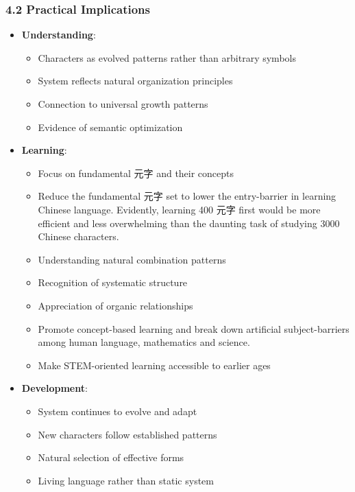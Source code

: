 \documentclass[
  11pt,
  letterpaper,
]{article}
\providecommand{\tightlist}{%
  \setlength{\itemsep}{0pt}\setlength{\parskip}{0pt}}
\begin{document}
\hypertarget{practical-implications}{%
\subsubsection{4.2 Practical
Implications}\label{practical-implications}}

\begin{itemize}
\tightlist
\item
  \textbf{Understanding}:

  \begin{itemize}
  \tightlist
  \item
    Characters as evolved patterns rather than arbitrary symbols
  \item
    System reflects natural organization principles
  \item
    Connection to universal growth patterns
  \item
    Evidence of semantic optimization
  \end{itemize}
\item
  \textbf{Learning}:

  \begin{itemize}
  \tightlist
  \item
    Focus on fundamental 元字 and their concepts
  \item
    Reduce the fundamental 元字 set to lower the entry-barrier in
    learning Chinese language. Evidently, learning 400 元字 first would
    be more efficient and less overwhelming than the daunting task of
    studying 3000 Chinese characters.
  \item
    Understanding natural combination patterns
  \item
    Recognition of systematic structure
  \item
    Appreciation of organic relationships
  \item
    Promote concept-based learning and break down artificial
    subject-barriers among human language, mathematics and science.
  \item
    Make STEM-oriented learning accessible to earlier ages
  \end{itemize}
\item
  \textbf{Development}:

  \begin{itemize}
  \tightlist
  \item
    System continues to evolve and adapt
  \item
    New characters follow established patterns
  \item
    Natural selection of effective forms
  \item
    Living language rather than static system
  \end{itemize}
\end{itemize}
\end{document}
